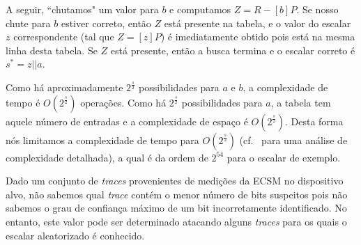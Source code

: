 \documentclass{SBCbookchapter}
\begin{document}
A seguir,  ``chutamos" um valor para $b$ e computamos $Z = R - [b] P$. Se nosso chute para $b$ estiver correto, então $Z$ está presente na tabela, e o valor do escalar $z$ correspondente (tal que $Z = [z] P$) é imediatamente obtido pois está na mesma linha desta tabela.
Se $Z$ está presente, então a busca termina e o escalar correto é $s^* = z||a$.


Como há aproximadamente $2^{\frac{s}{2}}$ possibilidades para $a$ e $b$, a complexidade de tempo é $O(2^{\frac{s}{2}})$ operações.
Como há $2^{\frac{s}{2}}$ possibilidades para $a$, a tabela tem aquele número de entradas e a complexidade de espaço é $O(2^{\frac{s}{2}})$.
Desta forma nós limitamos a complexidade de tempo para $O(2^{\frac{s}{2}})$ (cf.~\cite{Gopalakrishnan2007} para uma análise de complexidade detalhada), a qual é da ordem de $2^{54}$ para o escalar de exemplo.



Dado um conjunto de \emph{traces} provenientes de medições da ECSM no dispositivo alvo, não sabemos qual \emph{trace} contém o menor número de bits suspeitos pois não sabemos o  grau de confiança máximo de um bit incorretamente identificado.
No entanto, este valor pode ser determinado atacando alguns \emph{traces} para os quais o escalar aleatorizado é conhecido.
\end{document}
